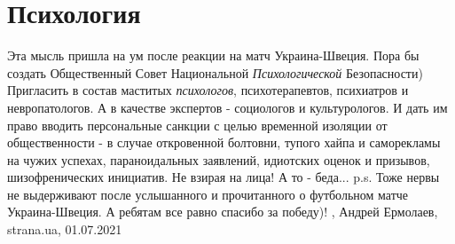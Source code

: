  
 
 
 
 
\chapter{Психология}
\label{sec:slova.psihologia}

Эта мысль пришла на ум после реакции на матч Украина-Швеция. Пора бы создать
Общественный Совет Национальной \emph{Психологической} Безопасности) Пригласить
в состав маститых \emph{психологов}, психотерапевтов, психиатров и
невропатологов. А в качестве экспертов - социологов и культурологов. И дать им
право вводить персональные санкции с целью временной изоляции от общественности
- в случае откровенной болтовни, тупого хайпа и саморекламы на чужих успехах,
параноидальных заявлений, идиотских оценок и призывов, шизофренических
инициатив.  Не взирая на лица!  А то - беда...  p.s. Тоже нервы не выдерживают
после услышанного и прочитанного о футбольном матче Украина-Швеция.  А ребятам
все равно спасибо за победу)!
, 
Андрей Ермолаев, strana.ua, 01.07.2021

